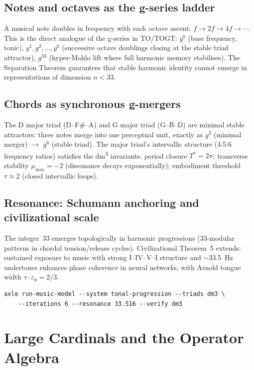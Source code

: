 \section{Notes and octaves as the g-series ladder}

A musical note doubles in frequency with each octave ascent: $f \to 2f \to 4f \to \cdots$. This is the direct analogue of the g-series in TO/TOGT: $g^0$ (base frequency, tonic), $g^1, g^2, \ldots, g^6$ (successive octave doublings closing at the stable triad attractor), $g^{33}$ (hyper-Mahlo lift where full harmonic memory stabilises). The Separation Theorem guarantees that stable harmonic identity cannot emerge in representations of dimension $n < 33$.

\section{Chords as synchronous g-mergers}

The D major triad (D--F\#--A) and G major triad (G--B--D) are minimal stable attractors: three notes merge into one perceptual unit, exactly as $g^2$ (minimal merger) $\to$ $g^6$ (stable triad). The major triad's intervallic structure (4:5:6 frequency ratios) satisfies the dm\textsuperscript{3} invariants: period closure $T^* = 2\pi$; transverse stability $\mu_{\max} = -2$ (dissonance decays exponentially); embodiment threshold $\tau \approx 2$ (closed intervallic loops).

\section{Resonance: Schumann anchoring and civilizational scale}

The integer~33 emerges topologically in harmonic progressions (33-modular patterns in chordal tension/release cycles). Civilizational Theorem~5 extends: sustained exposure to music with strong I--IV--V--I structure and $\sim$33.5~Hz undertones enhances phase coherence in neural networks, with Arnold tongue width $\tau \cdot \varepsilon_0 = 2/3$.

\begin{verbatim}
axle run-music-model --system tonal-progression --triads dm3 \
    --iterations 6 --resonance 33.516 --verify dm3
\end{verbatim}

\chapter{Large Cardinals and the Operator Algebra}

